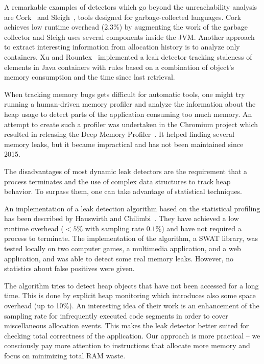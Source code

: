 \documentclass[preprint, numbers]{sigplanconf}
\begin{document}
A remarkable examples of detectors which go beyond the unreachability analysis
are Cork~\cite{cork} and Sleigh~\cite{sleigh}, tools designed for garbage-collected languages.
Cork achieves low runtime overhead (2.3\%) by augmenting the work of the garbage collector
and Sleigh uses several components inside the JVM.
Another approach to extract interesting information from allocation history
is to analyze only containers.
Xu and Rountex~\cite{containers} implemented a leak detector tracking staleness
of elements in Java containers with rules based on a combination of
object's memory consumption and the time since last retrieval.

When tracking memory bugs gets difficult for automatic tools, one might
try running a human-driven memory profiler and analyze the information about the heap usage
to detect parts of the application consuming too much memory.
An attempt to create such a profiler was undertaken in the Chromium project
which resulted in releasing the
Deep Memory Profiler~\cite{deep}.
It helped finding several memory leaks, but it became impractical
and has not been maintained since 2015.

The disadvantages of most dynamic leak detectors are the requirement that
a process terminates and the use of complex data structures to track heap behavior.
To surpass them, one can take advantage of statistical techniques.

An implementation of a leak detection algorithm based on the statistical profiling
has been described by Hauswirth and Chilimbi~\cite{hauswirth}.
They have achieved a low runtime overhead ($<5\%$ with sampling rate $0.1\%$) and have not required a process
to terminate.
The implementation of the algorithm, a SWAT library, was tested locally on two computer games,
a multimedia application, and a web application, and was able to detect some real memory leaks.
However, no statistics about false positives were given.

The algorithm tries to detect heap objects that have not been accessed for a long time.
This is done by explicit heap monitoring which introduces also some space overhead (up to 10\%).
An interesting idea of their work is an enhancement of the sampling rate
for infrequently executed code segments in order to cover miscellaneous allocation events.
This makes the leak detector better suited for checking total correctness of
the application.
Our approach is more practical -- we consciously pay more attention to
instructions that allocate more memory and focus on minimizing total RAM waste.
\end{document}
